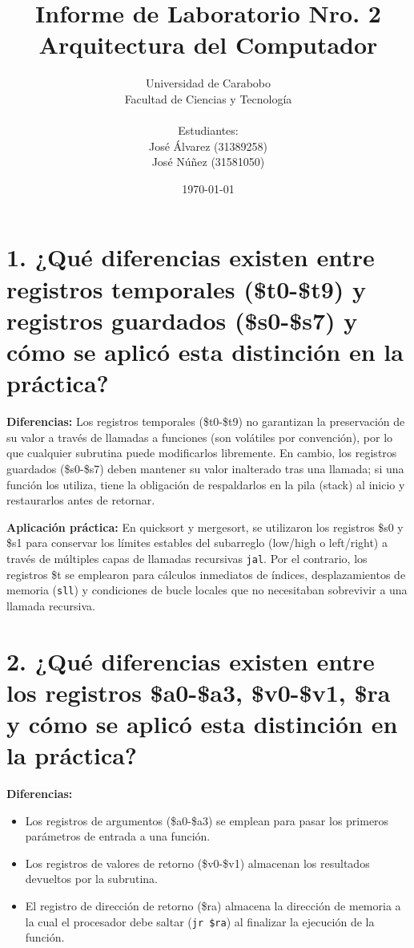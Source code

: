 \documentclass[12pt,a4paper]{article}
\title{Informe de Laboratorio Nro. 2 \\ Arquitectura del Computador}
\author{
    Universidad de Carabobo \\
    Facultad de Ciencias y Tecnología \\
    \vspace{0.5cm} \\
    Estudiantes: \\
    José Álvarez (31389258) \\
    José Núñez (31581050)
}
\date{\today}
\begin{document}
\maketitle

\section*{1. ¿Qué diferencias existen entre registros temporales (\$t0-\$t9) y registros guardados (\$s0-\$s7) y cómo se aplicó esta distinción en la práctica?}

\textbf{Diferencias:} Los registros temporales (\$t0-\$t9) no garantizan la preservación de su valor a través de llamadas a funciones (son volátiles por convención), por lo que cualquier subrutina puede modificarlos libremente. En cambio, los registros guardados (\$s0-\$s7) deben mantener su valor inalterado tras una llamada; si una función los utiliza, tiene la obligación de respaldarlos en la pila (stack) al inicio y restaurarlos antes de retornar.

\textbf{Aplicación práctica:} En quicksort y mergesort, se utilizaron los registros \$s0 y \$s1 para conservar los límites estables del subarreglo (low/high o left/right) a través de múltiples capas de llamadas recursivas \texttt{jal}. Por el contrario, los registros \$t se emplearon para cálculos inmediatos de índices, desplazamientos de memoria (\texttt{sll}) y condiciones de bucle locales que no necesitaban sobrevivir a una llamada recursiva.

\section*{2. ¿Qué diferencias existen entre los registros \$a0-\$a3, \$v0-\$v1, \$ra y cómo se aplicó esta distinción en la práctica?}

\textbf{Diferencias:}
\begin{itemize}
    \item Los registros de argumentos (\$a0-\$a3) se emplean para pasar los primeros parámetros de entrada a una función.
    \item Los registros de valores de retorno (\$v0-\$v1) almacenan los resultados devueltos por la subrutina.
    \item El registro de dirección de retorno (\$ra) almacena la dirección de memoria a la cual el procesador debe saltar (\texttt{jr \$ra}) al finalizar la ejecución de la función.
\end{itemize}
\end{document}
